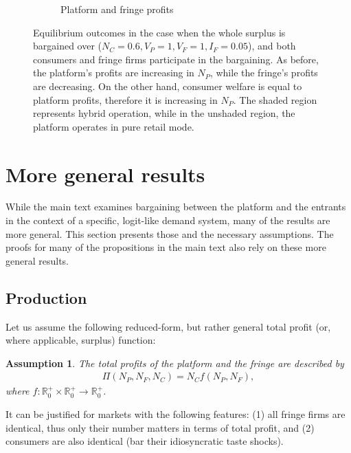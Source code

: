 \documentclass[a4paper]{article}
\newtheorem{assumption}{Assumption}
\begin{document}
\begin{figure}
\begin{subfigure}[b]{0.45\textwidth}
        \caption{Platform and fringe profits}
        \label{fig:profits_full_surplus_two_sided}
    \end{subfigure}
    \caption{Equilibrium outcomes in the case when the whole surplus is bargained over ($N_C = 0.6, V_P = 1, V_F = 1, I_F = 0.05$), and both consumers and fringe firms participate in the bargaining. As before, the platform's profits are increasing in $N_P$, while the fringe's profits are decreasing. On the other hand, consumer welfare is equal to platform profits, therefore it is increasing in $N_P$. The shaded region represents hybrid operation, while in the unshaded region, the platform operates in pure retail mode.}
    \label{fig:equilibrium_full_surplus_two_sided}
\end{figure}



\section{More general results}
\label{sec:more_general}

While the main text examines bargaining between the platform and the entrants in the context of a specific, logit-like demand system, many of the results are more general.
This section presents those and the necessary assumptions.
The proofs for many of the propositions in the main text also rely on these more general results.

\subsection{Production}
\label{sec:more_general_production}

Let us assume the following reduced-form, but rather general total profit (or, where applicable, surplus) function:
\begin{assumption}
    \label{ass:identical_fringe}
    The total profits of the platform and the fringe are described by 
    \begin{align*}
        \Pi(N_P, N_F, N_C) = N_C f(N_P, N_F),
    \end{align*}
    where $f: \mathbb{R}^+_0 \times \mathbb{R}^+_0 \to \mathbb{R}^+_0$.
\end{assumption}
It can be justified for markets with the following features: (1) all fringe firms are identical, thus only their number matters in terms of total profit, and (2) consumers are also identical (bar their idiosyncratic taste shocks).
\end{document}
